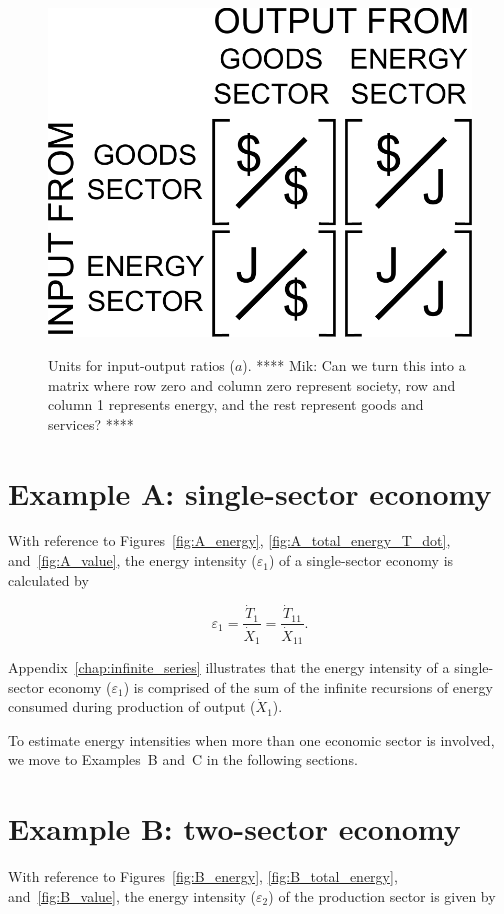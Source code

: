 \begin{figure}[h!]
\centering\
\includegraphics[width=0.4\linewidth]{Part_2/Chapter_Intensity/images/I-O_units.pdf}
\caption{Units for input-output ratios ($a$). **** Mik: Can we turn this
into a matrix where row zero and column zero represent society, 
row and column 1 represents energy, and the rest represent goods and services? ****}
\label{fig:A_matrix_units}
\end{figure}


\section{Example A: single-sector economy} %

With reference to Figures~\ref{fig:A_energy}, 
\ref{fig:A_total_energy_T_dot}, 
and~\ref{fig:A_value},
the energy intensity ($\varepsilon_{1}$) of a single-sector economy is calculated by

\begin{equation} \label{eq:A-energy_intensity}
	\varepsilon_{1} 
	= \frac{\dot{T}_{1}}{\dot{X}_{1}} 
	= \frac{\dot{T}_{11}}{\dot{X}_{11}}.
\end{equation}

Appendix~\ref{chap:infinite_series} illustrates that the energy 
intensity of a single-sector economy ($\varepsilon_{1}$) 
is comprised of the sum of the infinite recursions
of energy consumed during production of output ($\dot{X}_{1}$).

To estimate energy intensities
when more than one economic sector is involved, 
we move to Examples~B and~C in the following sections.


\section{Example B: two-sector economy} %

With reference to Figures~\ref{fig:B_energy}, 
\ref{fig:B_total_energy},
and~\ref{fig:B_value}, 
the energy intensity ($\varepsilon_{2}$) 
of the production sector is given by


